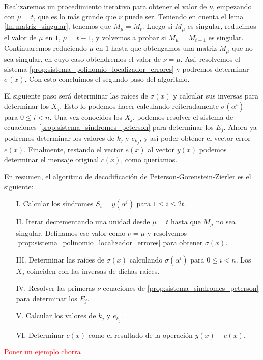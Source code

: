 Realizaremos un procedimiento iterativo para obtener el valor de $\nu$, empezando con $\mu = t$, que es lo más grande que $\nu$ puede ser. Teniendo en cuenta el lema \ref{lm:matriz_singular}, tenemos que $M_\mu = M_t$. Luego si $M_\mu$ es singular, reducimos el valor de $\mu$ en $1$, $\mu = t - 1$, y volvemos a probar si $M_\mu = M_{t-1}$ es singular. Continuaremos reduciendo $\mu$ en $1$ hasta que obtengamos una matriz $M_\mu$ que no sea singular, en cuyo caso obtendremos el valor de $\nu = \mu$. Así, resolvemos el sistema \ref{prop:sistema_polinomio_localizador_errores} y podremos determinar $\sigma(x)$. Con esto concluimos el segundo paso del algoritmo.

El siguiente paso será determinar las raíces de $\sigma(x)$ y calcular sus inversas para determinar los $X_j$. Esto lo podemos hacer calculando reiteradamente $\sigma(\alpha^i)$ para $0 \leq i < n$. Una vez conocidos los $X_j$, podemos resolver el sistema de ecuaciones \ref{prop:sistema_sindromes_peterson} para determinar los $E_j$. Ahora ya podremos determinar los valores de $k_j$ y $e_{k_j}$, y así poder obtener el vector error $e(x)$. Finalmente, restando el vector $e(x)$ al vector $y(x)$ podemos determinar el mensaje original $c(x)$, como queríamos.

En resumen, el algoritmo de decodificación de Peterson-Gorenstein-Zierler es el siguiente:

\begin{itemize}
    \item[I.] Calcular los síndromes $S_i = y(\alpha^i)$ para $1 \leq i \leq 2t$.
    \item[II.] Iterar decrementando una unidad desde $\mu = t$ hasta que $M_{\mu}$ no sea singular. Definamos ese valor como $\nu = \mu$ y resolvemos \ref{prop:sistema_polinomio_localizador_errores} para obtener $\sigma(x)$.
    \item[III.] Determinar las raíces de $\sigma(x)$ calculando $\sigma(\alpha^i)$ para $0 \leq i < n$. Los $X_j$ coinciden con las inversas de dichas raíces.
    \item[IV.] Resolver las primeras $\nu$ ecuaciones de \ref{prop:sistema_sindromes_peterson} para determinar los $E_j$.
    \item[V.] Calcular los valores de $k_j$ y $e_{k_j}$.
    \item[VI.] Determinar $c(x)$ como el resultado de la operación $y(x) - e(x)$.
\end{itemize}

\begin{exampleth}
    \textcolor{red}{Poner un ejemplo chorra}
\end{exampleth}

